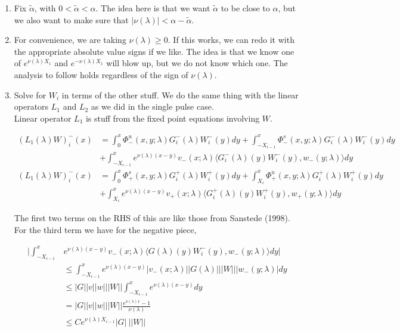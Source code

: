 \documentclass[12pt]{article}
\begin{document}
\begin{enumerate}

\item Fix $\tilde{\alpha}$, with $0 < \tilde{\alpha} < \alpha$. The idea here is that we want $\tilde{\alpha}$ to be close to $\alpha$, but we also want to make sure that $|\nu(\lambda)| < \alpha - \tilde{\alpha}$.

\item For convenience, we are taking $\nu(\lambda) \geq 0$. If this works, we can redo it with the appropriate absolute value signs if we like. The idea is that we know one of $e^{\nu(\lambda) X_1}$ and $e^{-\nu(\lambda) X_1}$ will blow up, but we do not know which one. The analysis to follow holds regardless of the sign of $\nu(\lambda)$.

\item Solve for $W_i$ in terms of the other stuff. We do the same thing with the linear operators $L_1$ and $L_2$ as we did in the single pulse case.\\

Linear operator $L_1$ is stuff from the fixed point equations involving $W$.

\begin{align*}
(L_1(\lambda)W)_i^-(x) &= \int_0^x \Phi^u_-(x, y; \lambda) G_i^-(\lambda)W_i^-(y) dy + \int_{-X_{i-1}}^x \Phi^s_-(x, y; \lambda) G_i^-(\lambda)W_i^-(y) dy \\
&+ \int_{-X_{i-1}}^x 
e^{\nu(\lambda)(x-y)} v_-(x; \lambda) \langle G_i^-(\lambda)(y)W_i^-(y), w_-(y; \lambda) \rangle dy \\
(L_1(\lambda)W)_i^-(x) &= \int_0^x \Phi^s_+(x, y; \lambda) G_i^+(\lambda)W_i^+(y) dy + \int_{X_i}^x \Phi^u_+(x, y; \lambda) G_i^+(\lambda) W_i^+(y) dy \\
&+ \int_{X_i}^x e^{\nu(\lambda)(x-y)} v_+(x; \lambda) \langle G_i^+(\lambda)(y)W_i^+(y), w_+(y; \lambda) \rangle dy
\end{align*}

The first two terms on the RHS of this are like those from Sanstede (1998). For the third term we have for the negative piece,

\begin{align*}
\Big| \int_{-X_{i-1}}^x &e^{\nu(\lambda)(x-y)} v_-(x; \lambda) \langle G(\lambda)(y)W_i^-(y), w_-(y; \lambda) \rangle dy \Big| \\
&\leq \int_{-X_{i-1}}^x e^{\nu(\lambda)(x-y)} |v_-(x; \lambda)| |G(\lambda)|||W|||w_-(y; \lambda)|dy \\
&\leq |G||v||w|||W|| \int_{-X_{i-1}}^x e^{\nu(\lambda)(x-y)} dy \\
&= |G||v||w|||W|| \frac{e^{\nu(\lambda)x} - 1}{\nu(\lambda)} \\
&\leq C e^{\nu(\lambda)X_{i-1}} |G| \: ||W||
\end{align*}


\end{enumerate}
\end{document}
